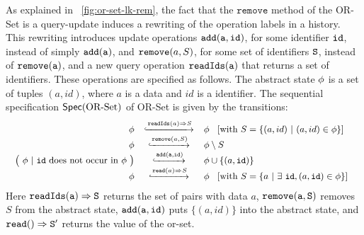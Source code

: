 \begin{example}
\label{definition:sequential specification of or-set}
As explained in \figureautorefname~\ref{fig:or-set-lk-rem}, the fact that the $\mathtt{remove}$
method of the OR-Set is a query-update induces a rewriting of the operation labels in a
history. This rewriting introduces update operations $\alabelshort[{\tt add}]{a,id}$, for some identifier ${\tt id}$, instead of simply $\alabelshort[{\tt add}]{a}$,
and $\alabelshort[\mathtt{remove}]{a,S}$, for some set of identifiers ${\tt S}$, instead of $\alabelshort[{\tt remove}]{a}$,
and a new query operation $\alabelshort[{\tt readIds}]{a}$ that returns a set of identifiers. These operations are specified as follows.
%
The abstract state $\abstate$ is a set of tuples $(a,id)$, where $a$
is a data and $id$ is a identifier. The sequential specification
$\specOrSet$ of OR-Set is given by the transitions:
\[\small
  \begin{array}{rcl}
    \abstate
    & \specarrow{\alabellong[\mathtt{readIds}]{a}{S}{}}
    & \abstate\
      \begin{array}{c}
        [\text{with}\ S = \{ (a,id)\ \vert\ (a,id) \in \abstate\}]
      \end{array}\\
    \abstate &
               \specarrow{\alabelshort[\mathtt{remove}]{a,S}}
    & \abstate \setminus S \\
    \big(\ \abstate\ |\ \mathtt{id}\ \text{does not occur in } \abstate\ \big)
             & \specarrow{ \alabelshort[{\tt add}]{a,id} }
    & \abstate \cup \{ (a,\mathtt{id}) \}\\
    \abstate
    & \specarrow{\alabellong[\mathtt{read}]{a}{ S }{}}
    & \abstate\
      \begin{array}{c}
        [\text{with}\ S = \{ a\ \vert\ \exists\ \mathtt{id}, (a,\mathtt{id}) \in \abstate \}]
      \end{array}
  \end{array}
\]
Here $\alabellong[{\tt readIds}]{a}{S}{}$ returns the set of pairs
with data $a$, $\alabelshort[{\tt remove}]{a,S}$ removes $S$ from the
abstract state, $\alabelshort[{\tt add}]{a,id}$ puts $\{ (a,id) \}$
into the abstract state, and $\alabellong[{\tt read}]{}{S'}{}$ returns
the value of the or-set.
\end{example}

